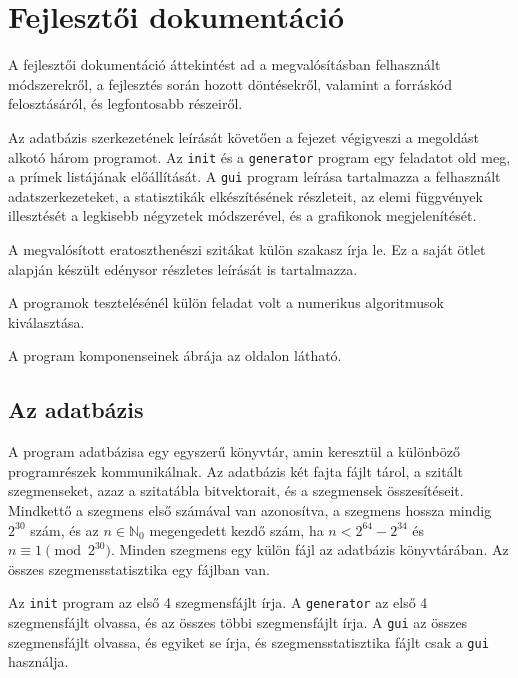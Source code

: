 \chapter{Fejlesztői dokumentáció}

A fejlesztői dokumentáció áttekintést ad a megvalósításban felhasznált módszerekről, a fejlesztés során hozott döntésekről, valamint a forráskód felosztásáról, és legfontosabb részeiről.

Az adatbázis szerkezetének leírását követően a fejezet végigveszi a megoldást alkotó három programot.
Az \texttt{init} és a \texttt{generator} program egy feladatot old meg, a prímek listájának előállítását.
A \texttt{gui} program leírása tartalmazza a felhasznált adatszerkezeteket, a statisztikák elkészítésének részleteit, az elemi függvények illesztését a legkisebb négyzetek módszerével, és a grafikonok megjelenítését.

A megvalósított eratoszthenészi szitákat külön szakasz írja le.
Ez a saját ötlet alapján készült edénysor részletes leírását is tartalmazza.

A programok tesztelésénél külön feladat volt a numerikus algoritmusok kiválasztása.

A program komponenseinek ábrája az \pageref{komponensek} oldalon látható.

\section{Az adatbázis}

A program adatbázisa egy egyszerű könyvtár, amin keresztül a különböző programrészek kommunikálnak.
Az adatbázis két fajta fájlt tárol, a szitált szegmenseket, azaz a szitatábla bitvektorait, és a szegmensek összesítéseit.
Mindkettő a szegmens első számával van azonosítva, a szegmens hossza mindig $2^{30}$ szám, és az $n \in \mathbb{N}_0$ megengedett kezdő szám, ha $n < 2^{64}-2^{34}$ és $n \equiv 1 \pmod{2^{30}}$.
Minden szegmens egy külön fájl az adatbázis könyvtárában.
Az összes szegmensstatisztika egy fájlban van.

Az \texttt{init} program az első 4 szegmensfájlt írja.
A \texttt{generator} az első 4 szegmensfájlt olvassa, és az összes többi szegmensfájlt írja.
A \texttt{gui} az összes szegmensfájlt olvassa, és egyiket se írja, és szegmensstatisztika fájlt csak a \texttt{gui} használja.

